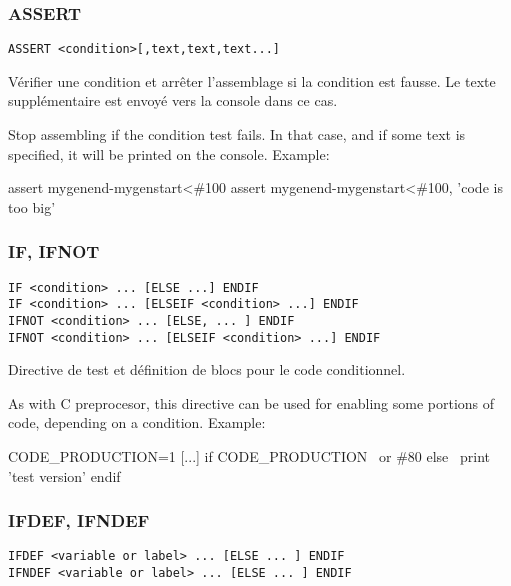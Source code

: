 \subsubsection{ASSERT}

\begin{verbatim}
ASSERT <condition>[,text,text,text...]
\end{verbatim}

\begin{xfr}
Vérifier une condition et arrêter l'assemblage si la condition est fausse. Le texte supplémentaire est envoyé vers la console dans ce cas.
\end{xfr}

\begin{xen}
Stop assembling if the condition test fails. In that case, and if some text is specified, it will be printed on the console. Example:
\end{xen}

\begin{code}
assert mygenend-mygenstart\textless\#100
assert mygenend-mygenstart\textless\#100, 'code is too big'
\end{code}


\subsubsection{IF, IFNOT}
\begin{verbatim}
IF <condition> ... [ELSE ...] ENDIF
IF <condition> ... [ELSEIF <condition> ...] ENDIF
IFNOT <condition> ... [ELSE, ... ] ENDIF
IFNOT <condition> ... [ELSEIF <condition> ...] ENDIF
\end{verbatim}

\begin{xfr}
Directive de test et définition de blocs pour le code conditionnel.
\end{xfr}

\begin{xen}
As with C preprocesor, this directive can be used for enabling some portions of code, depending on a condition.
Example:
\end{xen}

\begin{code}
CODE\_PRODUCTION=1
[...]
if CODE\_PRODUCTION
\  or \#80
else
\  print 'test version'
endif
\end{code}

\subsubsection{IFDEF, IFNDEF}
\begin{verbatim}
IFDEF <variable or label> ... [ELSE ... ] ENDIF
IFNDEF <variable or label> ... [ELSE ... ] ENDIF
\end{verbatim}


